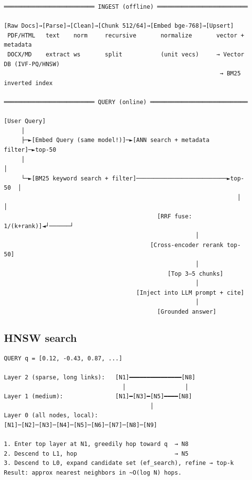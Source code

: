 \documentclass[11pt]{article}
\begin{document}
\begin{verbatim}
══════════════════════════ INGEST (offline) ══════════════════════════

[Raw Docs]→[Parse]→[Clean]→[Chunk 512/64]→[Embed bge-768]→[Upsert]
 PDF/HTML   text    norm     recursive       normalize       vector + metadata
 DOCX/MD    extract ws       split           (unit vecs)     → Vector DB (IVF-PQ/HNSW)
                                                              → BM25 inverted index

══════════════════════════ QUERY (online) ════════════════════════════

[User Query]
     │
     ├─►[Embed Query (same model!)]─►[ANN search + metadata filter]─►top-50
     │                                                                   │
     └─►[BM25 keyword search + filter]──────────────────────────►top-50  │
                                                                   │      │
                                            [RRF fuse: 1/(k+rank)]◄┘──────┘
                                                       │
                                          [Cross-encoder rerank top-50]
                                                       │
                                               [Top 3–5 chunks]
                                                       │
                                      [Inject into LLM prompt + cite]
                                                       │
                                            [Grounded answer]
\end{verbatim}

\subsection{HNSW search}\label{hnsw-search}

\setcodelang{}

\begin{verbatim}
QUERY q = [0.12, -0.43, 0.87, ...]

Layer 2 (sparse, long links):   [N1]━━━━━━━━━━━━━━━[N8]
                                  │                 │
Layer 1 (medium):               [N1]━[N3]━[N5]━━━━[N8]
                                          │
Layer 0 (all nodes, local):  [N1]─[N2]─[N3]─[N4]─[N5]─[N6]─[N7]─[N8]─[N9]

1. Enter top layer at N1, greedily hop toward q  → N8
2. Descend to L1, hop                            → N5
3. Descend to L0, expand candidate set (ef_search), refine → top-k
Result: approx nearest neighbors in ~O(log N) hops.
\end{verbatim}
\end{document}
